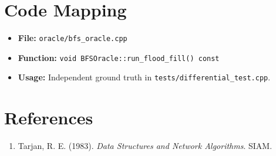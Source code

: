 \documentclass[11pt,a4paper]{article}
\begin{document}
\section{Code Mapping}
\begin{itemize}
    \item \textbf{File:} \texttt{oracle/bfs\_oracle.cpp}
    \item \textbf{Function:} \texttt{void BFSOracle::run\_flood\_fill() const}
    \item \textbf{Usage:} Independent ground truth in \texttt{tests/differential\_test.cpp}.
\end{itemize}

\section{References}
\begin{enumerate}
    \item Tarjan, R. E. (1983). \textit{Data Structures and Network Algorithms}. SIAM.
\end{enumerate}
\end{document}
